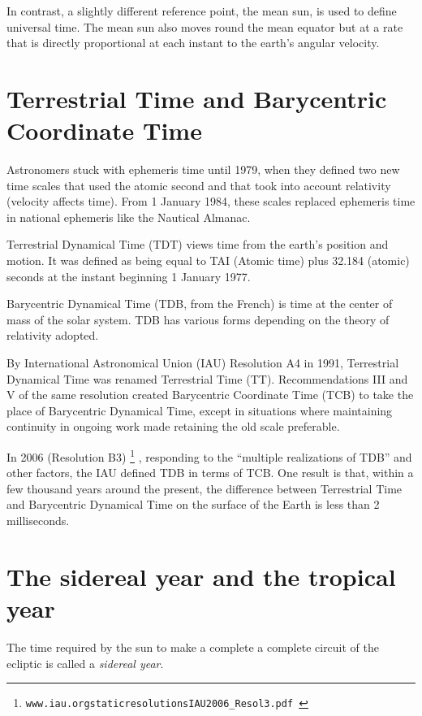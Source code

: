 In contrast, a slightly different reference point, the mean sun,
is used to define universal time. The mean sun also moves round the mean 
equator but at a rate that is directly proportional at each instant to the 
earth's angular velocity. 

\section{Terrestrial Time and Barycentric Coordinate Time}

Astronomers stuck with ephemeris time until 1979, when they defined two new 
time scales that used the atomic second and that took into account 
relativity (velocity affects time). From 1 January 1984, these scales 
replaced ephemeris time in national ephemeris like the Nautical Almanac.

Terrestrial Dynamical Time (TDT) views time from the earth's position and 
motion. It was defined as being equal to TAI (Atomic time) plus 
32.184 (atomic) seconds at the instant beginning 1 January 1977.

Barycentric Dynamical Time (TDB, from the French) is time at the center of 
mass of the solar system. TDB has various forms depending on the theory of 
relativity adopted.

By International Astronomical Union (IAU) Resolution A4 in 1991, 
Terrestrial Dynamical Time was renamed Terrestrial Time (TT). 
Recommendations III and V of the same resolution created 
Barycentric Coordinate Time (TCB) to take the place of Barycentric 
Dynamical Time, except in situations where maintaining continuity in 
ongoing work made retaining the old scale preferable.

In 2006 (Resolution B3)
\footnote{
\tt www.iau.org\/static\/resolutions\/IAU2006\_Resol3.pdf
}
, responding to the ``multiple realizations of TDB''
and other factors, the IAU defined TDB in terms of TCB. One result is that, 
within a few thousand years around the present, the difference between 
Terrestrial Time and Barycentric Dynamical Time on the surface of the Earth 
is less than 2 milliseconds. 

\section{The sidereal year and the tropical year}

The time required by the sun to make a complete a complete circuit of the 
ecliptic is called a {\it sidereal year}. 

